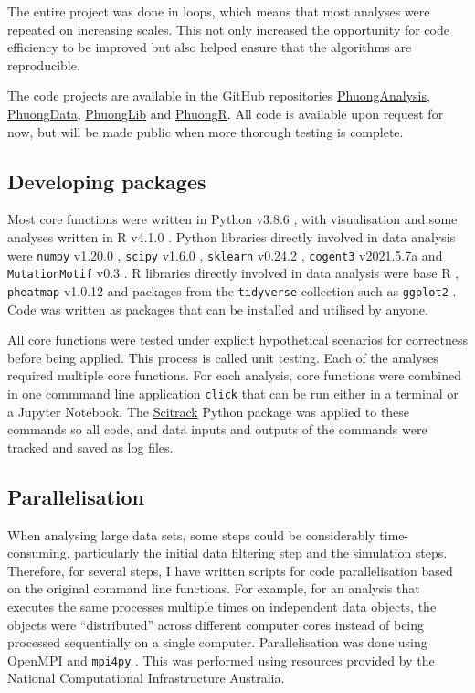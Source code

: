 The entire project was done in loops, which means that most analyses were repeated on increasing scales. This not only increased the opportunity for code efficiency to be improved but also helped ensure that the algorithms are reproducible. 

The code projects are available in the GitHub repositories \href{https://github.com/GavinHuttley/PhuongAnalysis}{PhuongAnalysis}, \href{{https://github.com/GavinHuttley/PhuongData}}{PhuongData}, \href{https://github.com/GavinHuttley/PhuongLibrary}{PhuongLib} and \href{https://github.com/Phuong-Le/PhuongR}{PhuongR}. All code is available upon request for now, but will be made public when more thorough testing is complete. 

\subsection{Developing packages}
Most core functions were written in Python v3.8.6 \citep{van1995python}, with visualisation and some analyses written in R v4.1.0 \citep{r}. Python libraries directly involved in data analysis were \texttt{numpy} v1.20.0 \citep{harris2020array}, \texttt{scipy} v1.6.0 \citep{2020SciPy-NMeth}, \texttt{sklearn} v0.24.2 \citep{scikit-learn}, \texttt{cogent3} v2021.5.7a \citep{pycogent3} and \texttt{MutationMotif} v0.3 \citep{Zhu2017}. R libraries directly involved in data analysis were base R \citep{RCoreTeam2019R:Computing}, \texttt{pheatmap} v1.0.12 \citep{pheatmap} and packages from the \texttt{tidyverse} collection such as \texttt{ggplot2} \citep{tidyverse}. Code was written as packages that can be installed and utilised by anyone.

All core functions were tested under explicit hypothetical scenarios for correctness before being applied. This process is called unit testing. Each of the analyses required multiple core functions. For each analysis, core functions were combined in one commmand line application \texttt{\href{https://click.palletsprojects.com/en/8.0.x/}{click}} that can be run either in a terminal or a Jupyter Notebook. The \href{https://github.com/HuttleyLab/scitrack}{Scitrack} Python package was applied to these commands so all code, and  data inputs and outputs of the commands were tracked and saved as log files.

\subsection{Parallelisation}
When analysing large data sets, some steps could be considerably time-consuming, particularly the initial data filtering step and the simulation steps. Therefore, for several steps, I have written scripts for code parallelisation based on the original command line functions. For example, for an analysis that executes the same processes multiple times on independent data objects, the objects were ``distributed'' across different computer cores instead of being processed sequentially on a single computer. Parallelisation was done using OpenMPI \citep{gabriel04:_open_mpi} and \texttt{mpi4py} \citep{Dalcin2011ParallelPython}. This was performed using resources provided by the National Computational Infrastructure Australia.



